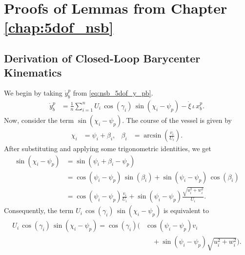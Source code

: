 \chapter{Proofs of Lemmas from Chapter \ref{chap:5dof_nsb}}

\section{Derivation of Closed-Loop Barycenter Kinematics}
\label{app:5dof_nsb_barycenter}
We begin by taking $\dot{y}_b^p$ from \eqref{eq:nsb_5dof_y_pb}.
\begin{align}
    \dot{y}_b^p &= \frac{1}{n}\sum_{i=1}^n U_i\,\cos\left(\gamma_i\right)\,\sin\left(\chi_i - \psi_p\right) - \dot{\xi}\,\iota\,x_b^p. \label{eq:nsb_5dof_y_pb_0}
\end{align}
Now, consider the term $\sin\left(\chi_i - \psi_p\right)$.
The course of the vessel is given by
\begin{align}
    \chi_i &= \psi_i + \beta_i, &
    \beta_i &= \arcsin\left(\frac{v_i}{U_i}\right).
\end{align}
After substituting and applying some trigonometric identities, we get
\begin{subequations}
    \begin{align}
        \sin\left(\chi_i - \psi_p\right) &= \sin\left(\psi_i + \beta_i - \psi_p\right) \\
        &= \cos\left(\psi_i - \psi_p\right)\,\sin\left(\beta_i\right) + \sin\left(\psi_i - \psi_p\right)\,\cos\left(\beta_i\right) \\
        &= \cos\left(\psi_i - \psi_p\right)\frac{v_i}{U_i} + \sin\left(\psi_i - \psi_p\right)\frac{\sqrt{u_i^2 + w_i^2}}{U_i}.
    \end{align}
\end{subequations}
Consequently, the term $U_i\,\cos\left(\gamma_i\right)\,\sin\left(\chi_i - \psi_p\right)$ is equivalent to
\begin{equation}
    \begin{split}
        U_i\,\cos\left(\gamma_i\right)\,\sin\left(\chi_i - \psi_p\right) = \cos\left(\gamma_i\right) \bigg(&\cos\left(\psi_i - \psi_p\right)v_i \\
        & \quad + \sin\left(\psi_i - \psi_p\right)\sqrt{u_i^2 + w_i^2}\bigg). 
    \end{split}
    \label{eq:nsb_5dof_y_pb_1}
\end{equation}

